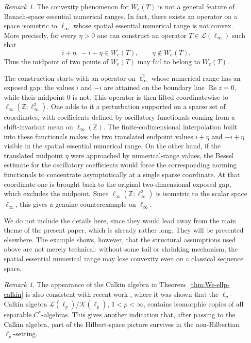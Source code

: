 \documentclass[11pt]{amsart}
\numberwithin{equation}{section}
\theoremstyle{definition}
\theoremstyle{remark}
\newtheorem{remark}[theorem]{Remark}
\begin{document}
\begin{remark}
The convexity phenomenon for \(W_e(T)\) is not a general
feature of Banach-space essential numerical ranges. In fact, there exists an
operator on a space isometric to \(\ell_\infty\) whose spatial essential numerical
range is not convex. More precisely, for every \(\eta>0\) one can construct an
operator \(T\in \mathcal L(\ell_\infty)\) such that
\[
        i+\eta,\,-i+\eta\in W_e(T),
        \qquad
        \eta\notin W_e(T).
\]
Thus the midpoint of two points of \(W_e(T)\) may fail to belong to \(W_e(T)\).


The construction starts with an operator on \(\ell_\infty^2\) whose numerical
range has an exposed gap: the values \(i\) and \(-i\) are attained on the
boundary line \(\operatorname{Re} z=0\), while their midpoint \(0\) is not.
This operator is then lifted coordinatewise to
\(\ell_\infty(\mathbb Z;\ell_\infty^2)\). One adds to it a perturbation
supported on a sparse set of coordinates, with coefficients defined by
oscillatory functionals coming from a shift-invariant mean on
\(\ell_\infty(\mathbb Z)\). The finite-codimensional interpolation built into
these functionals makes the two translated endpoint values \(i+\eta\) and
\(-i+\eta\) visible in the spatial essential numerical range. On the other
hand, if the translated midpoint \(\eta\) were approached by numerical-range
values, the Bessel estimate for the oscillatory coefficients would force the
corresponding norming functionals to concentrate asymptotically at a single
sparse coordinate. At that coordinate one is brought back to the original
two-dimensional exposed gap, which excludes the midpoint. Since
\(\ell_\infty(\mathbb Z;\ell_\infty^2)\) is isometric to the scalar space
\(\ell_\infty\), this gives a genuine counterexample on \(\ell_\infty\).






We do not include the details here, since they would lead away from the main
theme of the present paper, which is already rather long. They will be presented
elsewhere. The example shows, however, that the structural assumptions used above
are not merely technical: without some tail or shrinking mechanism, the spatial
essential numerical range may lose convexity even on a classical sequence space.
\end{remark}
\begin{remark}
The appearance of the Calkin algebra in Theorem~\ref{thm:We-ellp-calkin} is also consistent with recent work \cite{Boedihardjo2024}, where it was shown that the \(\ell_p\)-Calkin algebra \(\mathcal L(\ell_p)/\mathcal K(\ell_p)\), \(1<p<\infty\), contains isomorphic copies of all separable \(C^*\)-algebras. This gives another indication that, after passing to the Calkin algebra, part of the Hilbert-space picture survives in the non-Hilbertian \(\ell_p\)-setting.
\end{remark}
\end{document}
